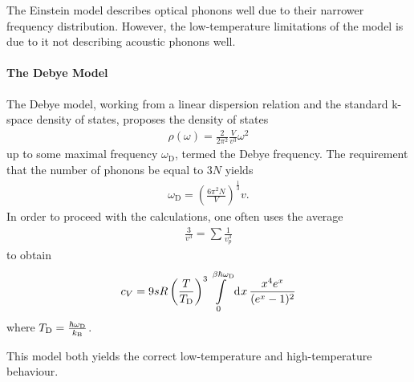 The Einstein model describes optical phonons well due to their narrower frequency distribution. However, the low-temperature limitations of the model is due to it not describing acoustic phonons well.

\paragraph{The Debye Model}
The Debye model, working from a linear dispersion relation and the standard k-space density of states, proposes the density of states
\begin{align*}
	\rho(\omega) = \frac{2}{2\pi^{2}}\frac{V}{v^{3}}\omega^{2}
\end{align*}
up to some maximal frequency $\omega_{\text{D}}$, termed the Debye frequency. The requirement that the number of phonons be equal to $3N$ yields
\begin{align*}
	\omega_{\text{D}} = \left(\frac{6\pi^{2}N}{V}\right)^{\frac{1}{3}}v.
\end{align*}
In order to proceed with the calculations, one often uses the average
\begin{align*}
	\frac{3}{v^{3}} = \sum\frac{1}{v_{p}^{3}}
\end{align*}
to obtain
\begin{align*}
	c_{V} = 9sR\left(\frac{T}{T_{\text{D}}}\right)^{3}\int\limits_{0}^{\beta\hbar\omega_{\text{D}}}\dd[]{x}\frac{x^{4}e^{x}}{(e^{x} - 1)^{2}}
\end{align*}
where $T_{\text{D}} = \frac{\hbar\omega_{\text{D}}}{k_{\text{B}}}$.
	
This model both yields the correct low-temperature and high-temperature behaviour.